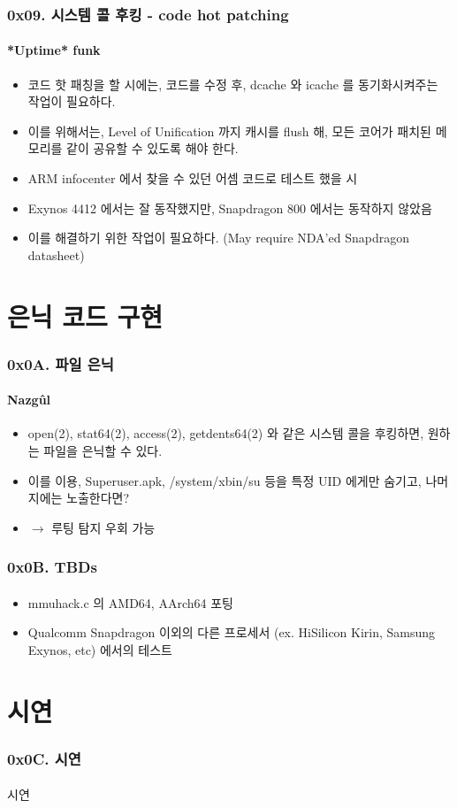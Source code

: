 \begin{frame}
  \frametitle{0x09. 시스템 콜 후킹 - code hot patching}
  \framesubtitle{*Uptime* funk}

  \begin{itemize}
  \item 코드 핫 패칭을 할 시에는, 코드를 수정 후, dcache 와 icache 를 동기화시켜주는 작업이 필요하다.
  \item 이를 위해서는, Level of Unification 까지 캐시를 flush 해, 모든 코어가 패치된 메모리를 같이 공유할 수 있도록 해야 한다.
  \item ARM infocenter 에서 찾을 수 있던 어셈 코드로 테스트 했을 시
  \item Exynos 4412 에서는 잘 동작했지만, Snapdragon 800 에서는 동작하지 않았음
  \item 이를 해결하기 위한 작업이 필요하다. (May require NDA'ed Snapdragon datasheet)
  \end{itemize}
\end{frame}

\section[Section]{은닉 코드 구현}
\begin{frame}
  \frametitle{0x0A. 파일 은닉}
  \framesubtitle{Nazgûl}

  \begin{itemize}
  \item open(2), stat64(2), access(2), getdents64(2) 와 같은 시스템 콜을 후킹하면, 원하는 파일을 은닉할 수 있다.
  \item 이를 이용, Superuser.apk, /system/xbin/su 등을 특정 UID 에게만 숨기고, 나머지에는 노출한다면?
  \item $\rightarrow$ 루팅 탐지 우회 가능
  \end{itemize}
\end{frame}

\begin{frame}
  \frametitle{0x0B. TBDs}
  \framesubtitle{}

  \begin{itemize}
  \item mmuhack.c 의 AMD64, AArch64 포팅
  \item Qualcomm Snapdragon 이외의 다른 프로세서 (ex. HiSilicon Kirin, Samsung Exynos, etc) 에서의 테스트
  \end{itemize}
\end{frame}

\section[Section]{시연}
\begin{frame}
  \frametitle{0x0C. 시연}
  \framesubtitle{}

  \begin{center}
  시연
  \end{center}
\end{frame}

